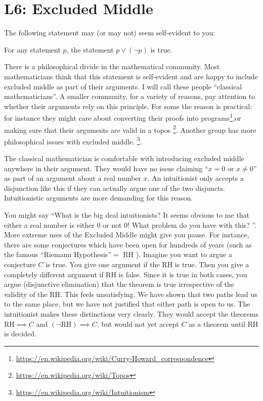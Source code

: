 \chapter{L6: Excluded Middle}

The following statement may (or may not) seem self-evident to you:

\begin{theorem}
	For any statement $p$, the statement $p \vee (\neg p)$ is true. 
\end{theorem}

There is a philosophical divide in the mathematical community.  Most mathematicians think that this statement is self-evident and are happy to include excluded middle as part of their arguments.  I will call these people ``classical mathematicians''.  A smaller community, for a variety of reasons, pay attention to whether their arguments rely on this principle.  For some the reason is practical: for instance they might care about converting their proofs into programs\footnote{\url{https://en.wikipedia.org/wiki/Curry-Howard_correspondence}},or  making sure that their arguments are valid in a topos \footnote{\url{https://en.wikipedia.org/wiki/Topos}}.  Another group has more philosophical issues with excluded middle. \footnote{\url{https://en.wikipedia.org/wiki/Intuitionism}}.

The classical mathematician is comfortable with introducing excluded middle anywhere in their argument.  They would have no issue claiming ``$x = 0$  or $x \neq 0$'' as part of an argument about a real number $x$.  An intuitionist only accepts a disjunction like this if they can actually argue one of the two disjuncts.  Intuitionistic arguments are more demanding for this reason.

You might say ``What is the big deal intuitionists?  It seems obvious to me that either a real number is either $0$ or not $0$!  What problem do you have with this? ''.
More extreme uses of the Excluded Middle might give you pause.  For instance, there are some conjectures which have been open for hundreds of years (such as the famous ``Riemann Hypothesis''$ =$ RH ).  Imagine you want to argue a conjecture $C$  is true.  You give one argument if the RH is true.  Then you give a completely different argument if RH is false.  Since it is true in both cases, you argue (disjunctive elimination) that the theorem is true irrespective of the validity of the RH.  This feels unsatisfying.  We have shown that two paths lead us to the same place, but we have not justified that either path is open to us.  The intuitionist makes these distinctions very clearly.  They would accept the theorems $\textrm{RH} \implies C$ and $(\neg \textrm{RH}) \implies C$, but would not yet accept $C$ as a theorem until RH is decided.

